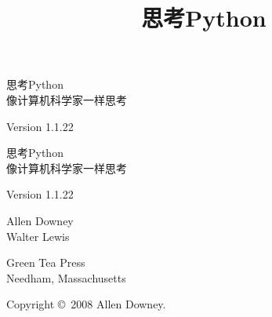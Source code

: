 \documentclass[10pt]{book}
\title{思考Python}
\newcommand{\theversion}{1.1.22}
\begin{document}
\frontmatter



\newtheorem{ex}{Exercise}[chapter]
\begin{latexonly}

\renewcommand{\blankpage}{\thispagestyle{empty} \quad \newpage}


\thispagestyle{empty}
\begin{flushright}
\vspace*{2.0in}

\begin{spacing}{3}
{\huge 思考Python}\\
{\Large 像计算机科学家一样思考}
\end{spacing}

\vspace{0.25in}

Version \theversion

\vfill
\end{flushright}

\blankpage
\blankpage

\pagebreak
\thispagestyle{empty}

\begin{flushright}
\vspace*{2.0in}

\begin{spacing}{3}
{\huge 思考Python}\\
{\Large 像计算机科学家一样思考}
\end{spacing}

\vspace{0.25in}
Version \theversion

{\Large
	Allen Downey\\
}
{\Large 
	Walter Lewis\\
}



\vspace{0.5in}

{\Large Green Tea Press}\\
{\small Needham, Massachusetts}

\vfill
\end{flushright}

\pagebreak
\thispagestyle{empty}

{\small
	Copyright \copyright ~2008 Allen Downey.

}
\end{latexonly}
\end{document}

